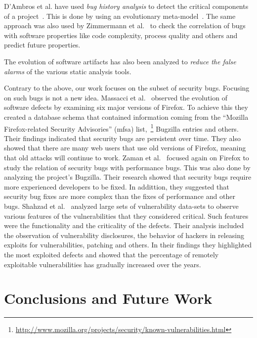 \documentclass[conference]{llncs}
\begin{document}
D'Ambros et al. have used {\it bug history analysis} to detect
the critical components of a project~\cite{D08}. This is done by using an
evolutionary meta-model~\cite{DL08}. The same approach was
also used by Zimmermann et al.~\cite{ZNA08} to check the correlation
of bugs with software properties like code complexity, process quality and others
and predict future properties.


The evolution of software artifacts has also been analyzed to {\it reduce the false
alarms} of the various static analysis tools.

Contrary to the above, our work focuses on the subset of security bugs.
Focusing on such bugs is not a new idea. Massacci et al.~\cite{MNN11} observed
the evolution of software defects by examining six major versions of Firefox.
To achieve this they created a database schema that contained information
coming from the ``Mozilla Firefox-related Security Advisories'' ({\sc mfsa})
list,~\footnote{\url{http://www.mozilla.org/projects/security/known-vulnerabilities.html}}
Bugzilla entries and others. Their findings indicated that security bugs are
persistent over time. They also showed that there are many web users that use
old versions of Firefox, meaning that old attacks will continue to work.
Zaman et al.~\cite{ZAH11} focused again on Firefox to study the relation of
security bugs with performance bugs. This was also done by analyzing the project's
Bugzilla. Their research showed that security bugs require more experienced developers
to be fixed. In addittion, they suggested that security bug fixes are more complex than the
fixes of performance and other bugs.
Shahzad et al.~\cite{SSL12} analyzed large sets of vulnerability data-sets to observe
various features of the vulnerabilities that they considered critical. Such features
were the functionality and the criticality of the defects. Their analysis
included the observation of vulnerability disclosures, the behavior of
hackers in releasing exploits for vulnerabilities, patching and others. In
their findings they highlighted the most exploited defects and showed that
the percentage of remotely exploitable vulnerabilities has gradually increased
over the years.

\section{Conclusions and Future Work}
\label{sec:con}
\end{document}
